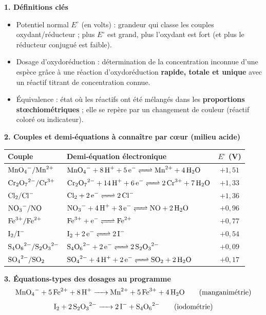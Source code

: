 \documentclass[11pt]{article}
\newcommand{\cle}[1]{{\popxbold\color{popdark}#1}}
\begin{document}
\begin{bilan}
\textbf{1. Définitions clés}
\begin{itemize}
  \item \cle{Potentiel normal} $E^\circ$ (en volts) : grandeur qui classe les couples oxydant/réducteur ; plus $E^\circ$ est grand, plus l'\cle{oxydant} est fort (et plus le réducteur conjugué est faible).
  \item \cle{Dosage d'oxydoréduction} : détermination de la concentration inconnue d'une espèce grâce à une réaction d'oxydoréduction \textbf{rapide, totale et unique} avec un réactif titrant de concentration connue.
  \item \cle{Équivalence} : état où les réactifs ont été mélangés dans les \textbf{proportions stœchiométriques} ; elle se repère par un changement de couleur (réactif coloré ou indicateur).
\end{itemize}

\textbf{2. Couples et demi-équations à connaître par cœur (milieu acide)}
\begin{center}
\begin{tabularx}{\linewidth}{|l|X|c|}
\hline
\rowcolor{popblueL} \textbf{Couple} & \textbf{Demi-équation électronique} & $E^\circ$ (V) \\
\hline
$\ce{MnO4-}/\ce{Mn^2+}$ & $\ce{MnO4- + 8H+ + 5e- <=> Mn^2+ + 4H2O}$ & $+1,51$ \\
\hline
$\ce{Cr2O7^2-}/\ce{Cr^3+}$ & $\ce{Cr2O7^2- + 14H+ + 6e- <=> 2Cr^3+ + 7H2O}$ & $+1,33$ \\
\hline
$\ce{Cl2}/\ce{Cl-}$ & $\ce{Cl2 + 2e- <=> 2Cl-}$ & $+1,36$ \\
\hline
$\ce{NO3-}/\ce{NO}$ & $\ce{NO3- + 4H+ + 3e- <=> NO + 2H2O}$ & $+0,96$ \\
\hline
$\ce{Fe^3+}/\ce{Fe^2+}$ & $\ce{Fe^3+ + e- <=> Fe^2+}$ & $+0,77$ \\
\hline
$\ce{I2}/\ce{I-}$ & $\ce{I2 + 2e- <=> 2I-}$ & $+0,54$ \\
\hline
$\ce{S4O6^2-}/\ce{S2O3^2-}$ & $\ce{S4O6^2- + 2e- <=> 2S2O3^2-}$ & $+0,09$ \\
\hline
$\ce{SO4^2-}/\ce{SO2}$ & $\ce{SO4^2- + 4H+ + 2e- <=> SO2 + 2H2O}$ & $+0,17$ \\
\hline
\end{tabularx}
\end{center}

\textbf{3. Équations-types des dosages au programme}
\[ \ce{MnO4- + 5Fe^2+ + 8H+ -> Mn^2+ + 5Fe^3+ + 4H2O} \qquad \text{(manganimétrie)} \]
\[ \ce{I2 + 2S2O3^2- -> 2I- + S4O6^2-} \qquad \text{(iodométrie)} \]


\end{bilan}
\end{document}
